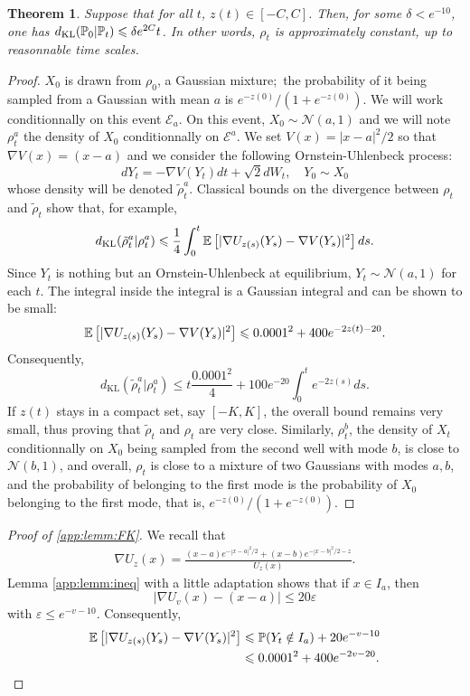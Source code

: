 \documentclass[a4paper,11pt]{extarticle}
\newtheorem{theorem}{Theorem}
\begin{document}
\begin{theorem}Suppose that for all $t$, $z(t) \in [-C,C]$. Then, for some $\delta < e^{-10}$, one has $d_{\mathrm{KL}}(\mathbb{P}_{0}|\mathbb{P}_t) \leqslant \delta e^{2C} t$. In other words, $\rho_t$ is approximately constant, up to reasonnable time scales. 
\end{theorem}

\begin{proof}
    $X_0$ is drawn from $\rho_0$, a Gaussian mixture; the probability of it being sampled from a Gaussian with mean $a$ is $e^{-z(0)}/(1 + e^{-z(0)})$. We will work conditionnally on this event $\mathcal{E}_a$. On this event, $X_0 \sim \mathcal{N}(a,1)$ and we will note $\rho_t^a$ the density of $X_0$ conditionnally on $\mathcal{E}^a$. We set $V(x) = |x-a|^2/2$ so that $\nabla V(x) = (x-a)$ and we consider the following Ornstein-Uhlenbeck process: 
    $$dY_t = -\nabla V(Y_t)dt + \sqrt{2}dW_t, \quad Y_0 \sim X_0$$
    whose density will be denoted $\tilde{\rho}^a_t$. Classical bounds on the divergence between $\rho_t$ and $\tilde{\rho}_t$ show that, for example, 
    $$d_{\text{KL}}(\tilde{\rho}_t^a | \rho_t^a) \leqslant \frac{1}{4}\int_0^t \mathbb{E}\left[|\nabla U_{z(s)}(Y_s) - \nabla V(Y_s)|^2\right]ds.$$
    Since $Y_t$ is nothing but an Ornstein-Uhlenbeck at equilibrium, $Y_t \sim \mathcal{N}(a,1)$ for each $t$. The integral inside the integral is a Gaussian integral and can be shown to be small: 
    \begin{equation}\label{app:lemm:FK}
        \mathbb{E}\left[|\nabla U_{z(s)}(Y_s) - \nabla V(Y_s)|^2\right] \leqslant 0.0001^2 + 400e^{-2z(t)-20}.
    \end{equation}
    Consequently, 
    $$d_{\text{KL}}(\tilde{\rho}_t^a | \rho_t^a) \leqslant t\frac{0.0001^2}{4} + 100e^{-20}\int_0^t e^{-2z(s)}ds .$$ 
    If $z(t)$ stays in a compact set, say $[-K,K]$, the overall bound remains very small, thus proving that $\tilde{\rho}_t$ and $\rho_t$ are very close. Similarly, $\rho_t^b$, the density of $X_t$ conditionnally on $X_0$ being sampled from the second well with mode $b$, is close to $\mathcal{N}(b,1)$, and overall, $\rho_t$ is close to a mixture of two Gaussians with modes $a,b$, and the probability of belonging to the first mode is the probability of $X_0$ belonging to the first mode, that is, $e^{-z(0)}/(1 + e^{-z(0)})$. 
\end{proof}


\begin{proof}[Proof of \eqref{app:lemm:FK}]We recall that 
    \begin{align}\nabla U_z(x) = \frac{(x-a)e^{-|x-a|^2/2} + (x-b)e^{-|x-b|^2/2 - z}}{U_z(x)}.\end{align}
    Lemma \ref{app:lemm:ineq} with a little adaptation shows that if $x\in I_a$, then 
    $$|\nabla U_v(x) - (x-a)| \leqslant 20\varepsilon$$
    with $\varepsilon \leqslant e^{-v-10}$. Consequently, 
    \begin{align}
        \mathbb{E}\left[|\nabla U_{z(s)}(Y_s) - \nabla V(Y_s)|^2\right] &\leqslant \mathbb{P}(Y_t \notin I_a) + 20e^{-v-10}\\ &\leqslant 0.0001^2 + 400e^{-2v-20}. 
    \end{align}
\end{proof}
\end{document}
